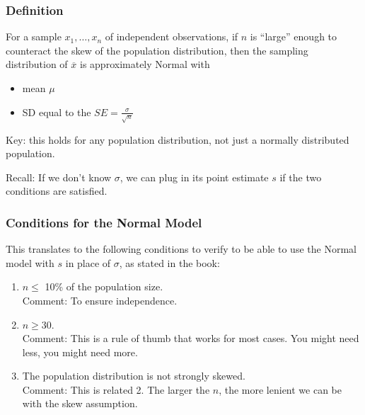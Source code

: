 \documentclass[handout]{beamer}
\newcommand{\blue}[1]{\textcolor{blue2}{#1}}
\newcommand{\xbar}{\overline{x}}
\begin{document}
\begin{frame}
\frametitle{Definition}

For a sample $x_1, \ldots, x_n$ of \blue{independent} observations, if $n$ is ``large'' enough to counteract the skew of the population distribution, then the sampling distribution of $\xbar$ is approximately Normal with
\begin{itemize}
\item mean $\mu$
\item SD equal to the $SE=\frac{\sigma}{\sqrt{n}}$
\end{itemize}

\vspace{0.25cm}

\pause\blue{Key}:  this holds for any population distribution, not just a normally distributed population.  

\vspace{0.25cm}

\pause \blue{Recall}: If we don't know $\sigma$, we can plug in its point estimate $s$ if the two conditions are satisfied.  


\end{frame}


\begin{frame}
\frametitle{Conditions for the Normal Model}

This translates to the following conditions to verify to be able to use the Normal model with $s$ in place of $\sigma$, as stated in the book:

\begin{enumerate}
\pause\item $n\leq$ 10\% of the population size.\\
\pause Comment:  To ensure independence.
\pause\item $n \geq 30$.\\
\pause Comment:  This is a \blue{rule of thumb} that works for most cases.  You might need less, you might need more.
\pause \item The population distribution is not strongly skewed.\\
Comment: This is related \blue{2}.  The larger the $n$, the more lenient we can be with the skew assumption.
\end{enumerate}

\end{frame}
\end{document}

